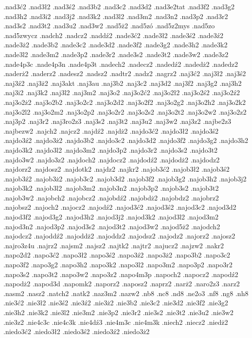 {.nad3ć2
.nad3ł2
.nad3ś2
.nad3b2
.nad3c2
.nad3d2
.nad3e2tat
.nad3f2
.nad3g2
.nad3h2
.nad3i2
.nad3j2
.nad3k2
.nad3l2
.nad3m2
.nad3n2
.nad3p2
.nad3r2
.nad3s2
.nad3t2
.nad3u2
.nad3w2
.nad5ż2
.nad5zó
.nad5z2mys
.nad5zo
.nad5zwycz
.nadch2
.nadcz2
.naddź2
.nade3ć2
.nade3ł2
.nade3ś2
.nade3ź2
.nade3ż2
.nade3b2
.nade3c2
.nade3d2
.nade3f2
.nade3g2
.nade3h2
.nade3k2
.nade3l2
.nade3m2
.nade3p2
.nade3r2
.nade3s2
.nade3t2
.nade3w2
.nade3z2
.nade4p3c
.nade4p3n
.nade4p3t
.nadech2
.nadecz2
.nadedź2
.nadedż2
.nadedz2
.naderż2
.naderz2
.nadesz2
.nadsz2
.nadtr2
.nadz2
.nagrz2
.naj3ć2
.naj3ł2
.naj3ś2
.naj3ź2
.naj3ż2
.naj3akt
.naj3au
.naj3b2
.naj3c2
.naj3d2
.naj3f2
.naj3g2
.naj3h2
.naj3i2
.naj3k2
.naj3l2
.naj3m2
.naj3o2
.naj3o2ć2
.naj3o2ł2
.naj3o2ś2
.naj3o2ź2
.naj3o2ż2
.naj3o2b2
.naj3o2c2
.naj3o2d2
.naj3o2f2
.naj3o2g2
.naj3o2h2
.naj3o2k2
.naj3o2l2
.naj3o2m2
.naj3o2p2
.naj3o2r2
.naj3o2s2
.naj3o2t2
.naj3o2w2
.naj3o2z2
.naj3p2
.naj3r2
.naj3ro2z3
.naj3s2
.naj3t2
.naj3u2
.naj3w2
.naj3z2
.najbe2z3
.najbezw2
.najch2
.najcz2
.najdź2
.najdż2
.najdo3ć2
.najdo3ł2
.najdo3ś2
.najdo3ź2
.najdo3ż2
.najdo3b2
.najdo3c2
.najdo3d2
.najdo3f2
.najdo3g2
.najdo3h2
.najdo3k2
.najdo3l2
.najdo3m2
.najdo3p2
.najdo3r2
.najdo3s2
.najdo3t2
.najdo3w2
.najdo3z2
.najdoch2
.najdocz2
.najdodź2
.najdodż2
.najdodz2
.najdorz2
.najdosz2
.najdotk2
.najdz2
.najkr2
.najob3ć2
.najob3ł2
.najob3ś2
.najob3ź2
.najob3ż2
.najob3c2
.najob3d2
.najob3f2
.najob3g2
.najob3h2
.najob3j2
.najob3k2
.najob3l2
.najob3m2
.najob3n2
.najob3p2
.najob3s2
.najob3t2
.najob3w2
.najobch2
.najobcz2
.najobdź2
.najobdż2
.najobdz2
.najobrz2
.najobsz2
.najoch2
.najocz2
.najodź2
.najod3ć2
.najod3ś2
.najod3c2
.najod3d2
.najod3f2
.najod3g2
.najod3h2
.najod3j2
.najod3k2
.najod3l2
.najod3m2
.najod3n2
.najod3p2
.najod3s2
.najod3t2
.najod3w2
.najod5ż2
.najodch2
.najodcz2
.najoddź2
.najoddż2
.najoddz2
.najodsz2
.najodz2
.najorz2
.najosz2
.najro3z4u
.najrz2
.najsm2
.najsz2
.najtk2
.najtr2
.najucz2
.najzw2
.nakr2
.napo2d2
.napo3ć2
.napo3ł2
.napo3ś2
.napo3ź2
.napo3ż2
.napo3b2
.napo3c2
.napo3f2
.napo3g2
.napo3h2
.napo3k2
.napo3l2
.napo3m2
.napo3p2
.napo3r2
.napo3s2
.napo3t2
.napo3w2
.napo3z2
.napo4m3p
.napoch2
.napocz2
.napodź2
.napodż2
.napod3d
.napomk2
.naporz2
.naposz2
.naprz2
.narż2
.naro2z3
.narz2
.nasm2
.nasz2
.natch2
.natk2
.naz3m2
.nazw2
.nb8
.nc8
.nd8
.ne2o3
.nf8
.ng8
.nh8
.nie3ć2
.nie3ł2
.nie3ś2
.nie3ź2
.nie3ż2
.nie3b2
.nie3c2
.nie3d2
.nie3f2
.nie3g2
.nie3h2
.nie3k2
.nie3l2
.nie3m2
.nie3p2
.nie3r2
.nie3s2
.nie3t2
.nie3u2
.nie3w2
.nie3z2
.nie4c3c
.nie4c3k
.nie4dź3
.nie4m3c
.nie4m3k
.niech2
.niecz2
.niedż2
.niedo3ć2
.niedo3ł2
.niedo3ś2
.niedo3ź2
.niedo3ż2
}
